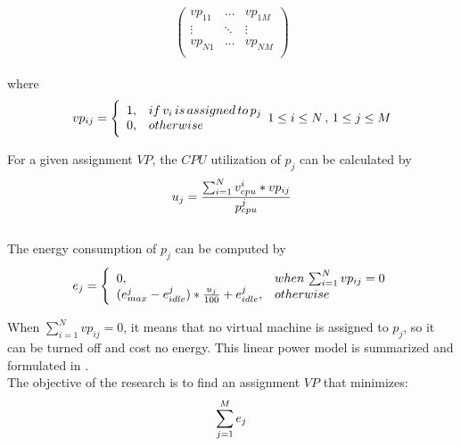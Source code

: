 \documentclass[10pt, conference, compsocconf]{IEEEtran}
\begin{document}
\begin{equation}\label{1}
    \left(
  \begin{array}{ccc}
    vp_{11} & \ldots & vp_{1M} \\
    \vdots & \ddots & \vdots \\
    vp_{N1} & \ldots & vp_{NM} \\
  \end{array}
\right)
\end{equation}\\
where\\
\begin{equation}\label{2}
    vp_{ij}=\Bigg\lbrace \begin{array}{cl}    
     1, & if\, v_i\, is\, assigned\,to\, p_j \\ 
    0, & otherwise \\
    \end{array} \\
    1\leq i\leq N \, , \, 1\leq j\leq M     
\end{equation}



 For a given assignment $VP$, the $CPU$ utilization of $p_j$ can be calculated by\\
 \begin{equation}\label{3}
 u_j=\frac{
\sum_{i=1}^Nv_{cpu}^i*vp_{ij}
 }{p_{cpu}^j} \\
\end{equation}\\

 The energy consumption of $p_j$ can be computed by\\

\begin{equation}\label{4}
    e_j=\Bigg\lbrace \begin{array}{ll}    
     0,& when \, \sum_{i=1}^Nvp_{ij}=0  \\
(e_{max}^j-e_{idle}^j)*\frac{u_j}{100}+e_{idle}^j,& otherwise\\
    \end{array} \\   
\end{equation}


 When $\sum_{i=1}^Nvp_{ij} =0$, it means that no virtual machine is assigned to
 $p_j$, so it can be turned off and cost no energy. This
 linear power model is summarized and formulated in \cite{beloglazov10}.
 \\

 The objective of the research is to find an assignment $VP$ that minimizes: \\
\begin{equation}\label{5}
\sum_{j=1}^Me_j  \\
\end{equation}
\end{document}
